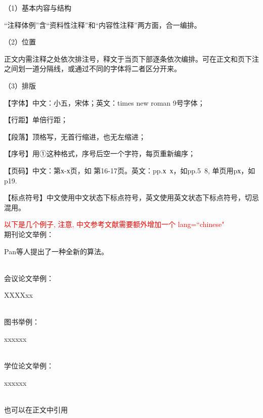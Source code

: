（1）基本内容与结构

“注释体例”含“资料性注释”和“内容性注释”两方面，合一编排。

（2）位置

正文内需注释之处依次排注号，释文于当页下部逐条依次编排。可在正文和页下注之间划一道分隔线，或通过不同的字体将二者区分开来。

（3）排版

【字体】中文：小五，宋体；英文：times new roman 9号字体；

【行距】单倍行距；

【段落】顶格写，无首行缩进，也无左缩进；

【序号】用①这种格式，序号后空一个字符，每页重新编序；

【页码】中文：第х-х页，如 第16-17页。英文：pp.х~х，如pp.5~8, 单页用pх，如p19.

【标点符号】中文使用中文状态下标点符号，英文使用英文状态下标点符号，切忌混用。

\textcolor{red}{以下是几个例子, 注意, 中文参考文献需要额外增加一个 lang=``chinese"}
~\\
期刊论文举例：

Pan等人提出了一种全新的算法\cite{pan2018classification, pan2014cell, song2013asynchronous, lin2022adaptive}。

~\\
会议论文举例：

XXXXxx\cite{li2021large}

~\\
图书举例：

xxxxxx\cite{shavlik1990readings, yan2006CFG}

~\\
学位论文举例：

xxxxxx\cite{jxd1996, CCPT}

~\\
也可以在正文中引用



